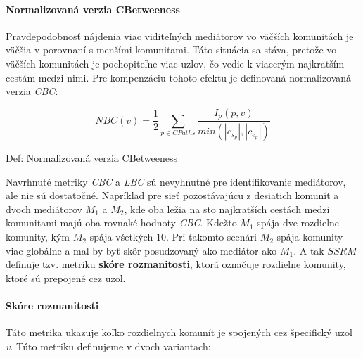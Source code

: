 \documentclass[slovak,master,public,dept460,male,cpdeclaration,oneside]{diploma}
\begin{document}
\paragraph{Normalizovaná verzia CBetweeness}
\hfill \break
Pravdepodobnosť nájdenia viac viditeľných mediátorov vo väčších komunitách je väčšia v porovnaní s menšími komunitami. Táto situácia sa stáva, pretože vo väčších komunitách je pochopiteľne viac uzlov, čo vedie k viacerým najkratším cestám medzi nimi. Pre kompenzáciu tohoto efektu je definovaná normalizovaná verzia \textit{CBC}: 


\begin{mycapequ}[!ht]
   \begin{equation*}
    NBC(v) = \frac{1}{2} \sum_{p \in CPaths} \frac{I_{p}(p, v)}{min(|c_{s_{p}}|,|c_{e_{p}}|)}
   \end{equation*}
   \caption{Def: Normalizovaná verzia CBetweeness}
\end{mycapequ}




\begin{sloppypar}
Navrhnuté metriky \textit{CBC} a \textit{LBC} sú nevyhnutné pre identifikovanie mediátorov, ale nie sú dostatočné. Napríklad pre sieť pozostávajúcu z desiatich komunít a dvoch mediátorov \textit{${M_1}$}
a \textit{${M_2}$}, kde oba ležia na sto najkratších cestách medzi komunitami majú oba rovnaké hodnoty \textit{CBC}. Kdežto \textit{${M_1}$} spája dve rozdielne komunity, kým \textit{${M_2}$} spája všetkých 10. Pri takomto scenári \textit{${M_2}$} spája komunity viac globálne a mal by byť skôr posudzovaný ako mediátor ako \textit{${M_1}$}. A tak \textit{${SSRM}$} definuje tzv. metriku \textbf{skóre rozmanitosti}, ktorá označuje rozdielne komunity, ktoré sú prepojené cez uzol.
\end{sloppypar}


\paragraph{Skóre rozmanitosti}
\hfill \break
Táto metrika ukazuje koľko rozdielnych komunít je spojených cez špecifický uzol \textit{v}. Túto metriku definujeme v dvoch variantach:
\end{document}
